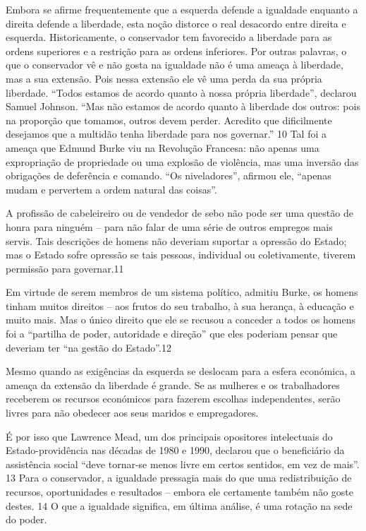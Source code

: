  \par 
Embora se afirme frequentemente que a esquerda defende a igualdade enquanto a direita defende a liberdade, esta noção distorce o real desacordo entre direita e esquerda. Historicamente, o conservador tem favorecido a liberdade para as ordens superiores e a restrição para as ordens inferiores. Por outras palavras, o que o conservador vê e não gosta na igualdade não é uma ameaça à liberdade, mas a sua extensão. Pois nessa extensão ele vê uma perda da sua própria liberdade. “Todos estamos de acordo quanto à nossa própria liberdade”, declarou Samuel Johnson. “Mas não estamos de acordo quanto à liberdade dos outros: pois na proporção que tomamos, outros devem perder. Acredito que dificilmente desejamos que a multidão tenha liberdade para nos governar.” {\color{blue}10} Tal foi a ameaça que Edmund Burke viu na Revolução Francesa: não apenas uma expropriação de propriedade ou uma explosão de violência, mas uma inversão das obrigações de deferência e comando. “Os niveladores”, afirmou ele, “apenas mudam e pervertem a ordem natural das coisas”.
 \par 
A profissão de cabeleireiro ou de vendedor de sebo não pode ser uma questão de honra para ninguém – para não falar de uma série de outros empregos mais servis. Tais descrições de homens não deveriam suportar a opressão do Estado; mas o Estado sofre opressão se tais pessoas, individual ou coletivamente, tiverem permissão para governar.{\color{blue}11}
 \par 
Em virtude de serem membros de um sistema político, admitiu Burke, os homens tinham muitos direitos – aos frutos do seu trabalho, à sua herança, à educação e muito mais. Mas o único direito que ele se recusou a conceder a todos os homens foi a “partilha de poder, autoridade e direção” que eles poderiam pensar que deveriam ter “na gestão do Estado”.{\color{blue}12}
 \par 
Mesmo quando as exigências da esquerda se deslocam para a esfera económica, a ameaça da extensão da liberdade é grande. Se as mulheres e os trabalhadores receberem os recursos económicos para fazerem escolhas independentes, serão livres para não obedecer aos seus maridos e empregadores.
 \par 
É por isso que Lawrence Mead, um dos principais opositores intelectuais do Estado-providência nas décadas de 1980 e 1990, declarou que o beneficiário da assistência social “deve tornar-se menos livre em certos sentidos, em vez de mais”. {\color{blue}13} Para o conservador, a igualdade pressagia mais do que uma redistribuição de recursos, oportunidades e resultados – embora ele certamente também não goste destes. {\color{blue}14} O que a igualdade significa, em última análise, é uma rotação na sede do poder.
